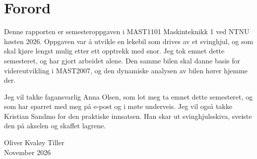 \section*{Forord}
Denne rapporten er semesteroppgaven i MAST1101 Maskinteknikk 1 ved NTNU høsten 2026. Oppgaven var å utvikle en lekebil som drives av et svinghjul, og som skal kjøre lengst mulig etter ett opptrekk med snor. Jeg tok emnet dette semesteret, og har gjort arbeidet alene. Den samme bilen skal danne basis for videreutvikling i MAST2007, og den dynamiske analysen av bilen hører hjemme der.

Jeg vil takke fagansvarlig Anna Olsen, som lot meg ta emnet dette semesteret, og som har sparret med meg på e-post og i møte underveis. Jeg vil også takke Kristian Sandmo for den praktiske innsatsen. Han skar ut svinghjulsskiva, sveiste den på akselen og skaffet lagrene.

\vspace{1cm}
\noindent Oliver Kvaløy Tiller\\
November 2026
